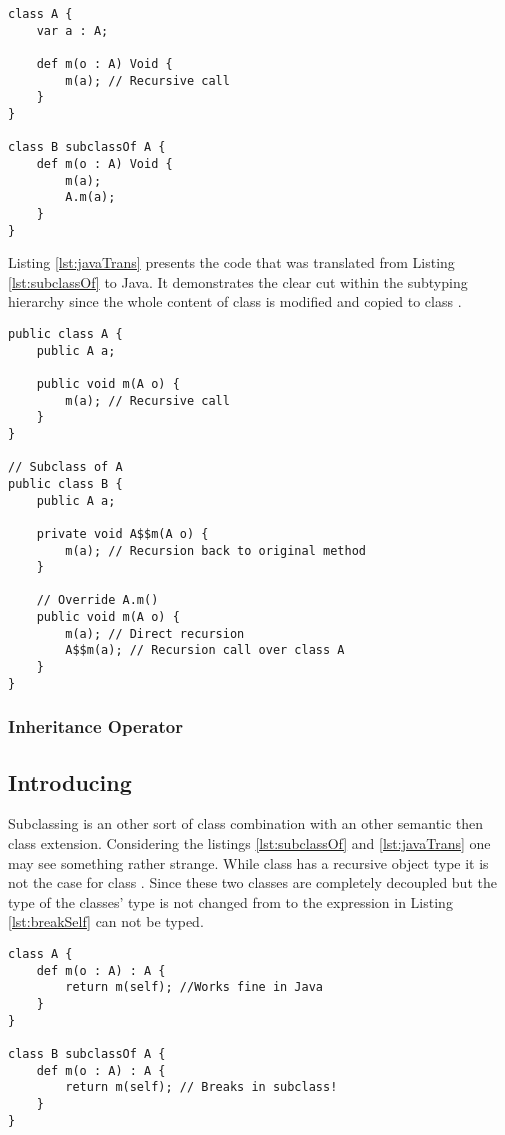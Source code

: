 \begin{lstlisting}[float,language=ooplss,caption=Subclassing in \ooplss,label=lst:subclassOf]
class A {
	var a : A;

	def m(o : A) Void {
		m(a); // Recursive call
	}
}

class B subclassOf A {
	def m(o : A) Void {
		m(a);
		A.m(a);
	}
}
\end{lstlisting}

Listing \ref{lst:javaTrans} presents the code that was translated from Listing 
\ref{lst:subclassOf} to Java. It demonstrates the clear cut within 
the subtyping hierarchy since the whole content of class \A is modified
and copied to class \B.

\begin{lstlisting}[float,caption=Subclassing translated to Java,label=lst:javaTrans]
public class A {
	public A a;

	public void m(A o) {
		m(a); // Recursive call
	}
}

// Subclass of A
public class B {
	public A a;

	private void A$$m(A o) {
		m(a); // Recursion back to original method
	}

	// Override A.m()
	public void m(A o) {
		m(a); // Direct recursion
		A$$m(a); // Recursion call over class A
	}
}
\end{lstlisting}

\subsubsection{Inheritance Operator}

\subsection{Introducing \mytype}
Subclassing is an other sort of class combination with an other semantic
then class extension. Considering the listings \ref{lst:subclassOf} and
\ref{lst:javaTrans} one may see something rather strange. While class \A
has a recursive object type it is not the case for class \B. Since these
two classes are completely decoupled but the type of the classes' type is
not changed from \A to \B the expression in Listing \ref{lst:breakSelf}
can not be typed.

\begin{lstlisting}[float,language=ooplss,caption=Illegal method m(o : \A) : \emph{Void} in class \B,label=lst:breakSelf]
class A {
	def m(o : A) : A {
		return m(self); //Works fine in Java
	}
}

class B subclassOf A {
	def m(o : A) : A {
		return m(self); // Breaks in subclass!
	}
}
\end{lstlisting}


